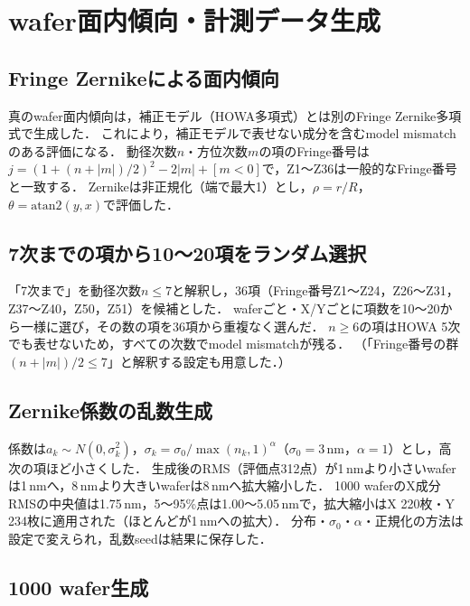 \documentclass[10.5pt,a4paper]{ltjsarticle}
\newcommand{\nm}{\,\mathrm{nm}}
\begin{document}
\section{wafer面内傾向・計測データ生成}

\subsection{Fringe Zernikeによる面内傾向}

真のwafer面内傾向は，補正モデル（HOWA多項式）とは別のFringe Zernike多項式で生成した．
これにより，補正モデルで表せない成分を含むmodel mismatchのある評価になる．
動径次数$n$・方位次数$m$の項のFringe番号は$j=(1+(n+|m|)/2)^2-2|m|+[m<0]$で，Z1〜Z36は一般的なFringe番号\cite{wyant1992}と一致する．
Zernikeは非正規化（端で最大1）とし，$\rho=r/R$，$\theta=\mathrm{atan2}(y,x)$で評価した．

\subsection{7次までの項から10〜20項をランダム選択}

「7次まで」を動径次数$n\le7$と解釈し，36項（Fringe番号Z1〜Z24，Z26〜Z31，Z37〜Z40，Z50，Z51）を候補とした．
waferごと・X/Yごとに項数を10〜20から一様に選び，その数の項を36項から重複なく選んだ．
$n\ge6$の項はHOWA 5次でも表せないため，すべての次数でmodel mismatchが残る．
（「Fringe番号の群$(n+|m|)/2\le7$」と解釈する設定も用意した．）

\subsection{Zernike係数の乱数生成}

係数は$a_k\sim N(0,\sigma_k^2)$，$\sigma_k=\sigma_0/\max(n_k,1)^\alpha$（$\sigma_0=3\nm$，$\alpha=1$）とし，高次の項ほど小さくした．
生成後のRMS（評価点312点）が1\,nmより小さいwaferは1\,nmへ，8\,nmより大きいwaferは8\,nmへ拡大縮小した．
1000 waferのX成分RMSの中央値は1.75\,nm，5〜95\%点は1.00〜5.05\,nmで，拡大縮小はX 220枚・Y 234枚に適用された（ほとんどが1\,nmへの拡大）．
分布・$\sigma_0$・$\alpha$・正規化の方法は設定で変えられ，乱数seedは結果に保存した．

\subsection{1000 wafer生成}
\end{document}
